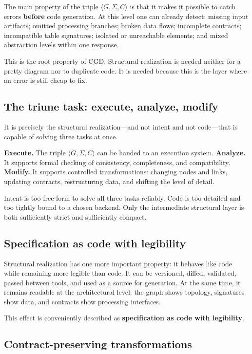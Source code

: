 \documentclass[12pt,a4paper]{article}
\begin{document}
The main property of the triple $\langle G, \Sigma, C \rangle$ is that it makes it possible to catch errors \textbf{before} code generation. At this level one can already detect: missing input artifacts; omitted processing branches; broken data flows; incomplete contracts; incompatible table signatures; isolated or unreachable elements; and mixed abstraction levels within one response.

This is the root property of CGD. Structural realization is needed neither for a pretty diagram nor to duplicate code. It is needed because this is the layer where an error is still cheap to fix.

\subsection{The triune task: execute, analyze, modify}

It is precisely the structural realization---and not intent and not code---that is capable of solving three tasks at once.

\textbf{Execute.} The triple $\langle G, \Sigma, C \rangle$ can be handed to an execution system. \textbf{Analyze.} It supports formal checking of consistency, completeness, and compatibility. \textbf{Modify.} It supports controlled transformations: changing nodes and links, updating contracts, restructuring data, and shifting the level of detail.

Intent is too free-form to solve all three tasks reliably. Code is too detailed and too tightly bound to a chosen backend. Only the intermediate structural layer is both sufficiently strict and sufficiently compact.

\subsection{Specification as code with legibility}

Structural realization has one more important property: it behaves like code while remaining more legible than code. It can be versioned, diffed, validated, passed between tools, and used as a source for generation. At the same time, it remains readable at the architectural level: the graph shows topology, signatures show data, and contracts show processing interfaces.

This effect is conveniently described as \textbf{specification as code with legibility}.

\subsection{Contract-preserving transformations}
\end{document}
